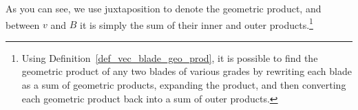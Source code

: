 \documentclass[12pt]{article}
\numberwithin{equation}{section}
\begin{document}
As you can see, we use juxtaposition to denote the geometric product, and
between $v$ and $B$ it is simply the sum of their inner and outer products.\footnote{Using
Definition~\ref{def_vec_blade_geo_prod}, it is possible to find the geometric
product of any two blades of various grades by rewriting each blade as a sum of geometric products,
expanding the product, and then converting each geometric product back into a
sum of outer products.}








\end{document}
